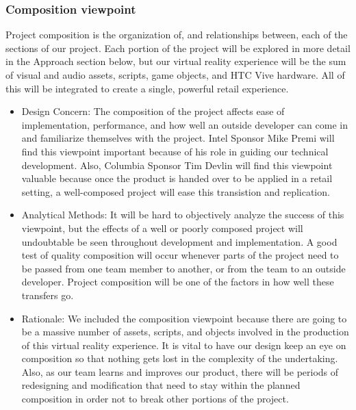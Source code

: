 \documentclass[10pt,journal,compsoc,onecolumn, draftclsnofoot]{IEEEtran}
\begin{document}
\subsubsection{Composition viewpoint}
Project composition is the organization of, and relationships between, each of
the sections of our project. Each portion of the project will be explored in
more detail in the Approach section below, but our virtual reality experience
will be the sum of visual and audio assets, scripts, game objects, and HTC Vive
hardware. All of this will be integrated to create a single, powerful retail
experience.
\begin{itemize}
  \item Design Concern: The composition of the project affects ease of
  implementation, performance, and how well an outside developer can come in
  and familiarize themselves with the project. Intel Sponsor Mike Premi will
  find this viewpoint important because of his role in guiding our technical
  development. Also, Columbia Sponsor Tim Devlin will find this viewpoint
  valuable because once the product is handed over to be applied in a retail
  setting, a well-composed project will ease this transistion and replication.
  \item Analytical Methods: It will be hard to objectively analyze the success
  of this viewpoint, but the effects of a well or poorly composed project will
  undoubtable be seen throughout development and implementation. A good test of
  quality composition will occur whenever parts of the project need to be
  passed from one team member to another, or from the team to an outside
  developer. Project composition will be one of the factors in how well these
  transfers go.
  \item Rationale: We included the composition viewpoint because there are
  going to be a massive number of assets, scripts, and objects involved in the
  production of this virtual reality experience. It is vital to have our design
  keep an eye on composition so that nothing gets lost in the complexity of the
  undertaking. Also, as our team learns and improves our product, there will be
  periods of redesigning and modification that need to stay within the planned
  composition in order not to break other portions of the project.
\end{itemize}
\end{document}
